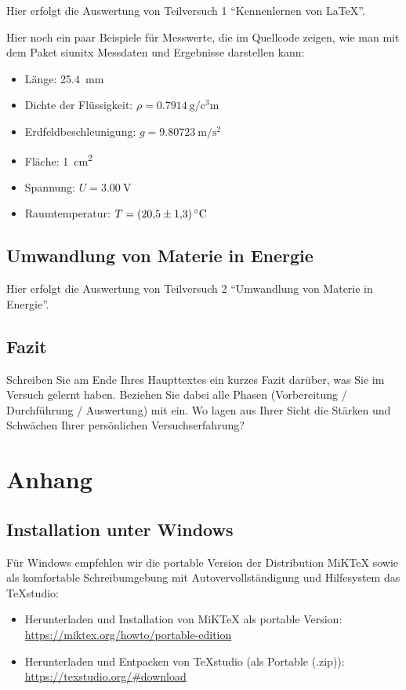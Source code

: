 \documentclass[a4paper,10pt]{report}
\begin{document}
	Hier erfolgt die Auswertung von Teilversuch 1 \enquote{Kennenlernen von \LaTeX}.
	
	Hier noch ein paar Beispiele für Messwerte, die im Quellcode zeigen, wie man mit dem Paket siunitx Messdaten und Ergebnisse darstellen kann:
	\begin{itemize}
		\item Länge: \SI{25.4}{\milli\meter}
		\item Dichte der Flüssigkeit: $\rho = \SI{0.7914}{\gram\per\cubic\centi\metre}$
		\item Erdfeldbeschleunigung: $g = \SI{9.80723}{\metre\per\square\second}$
		\item Fläche: \SI{1}{\centi\metre\squared}
		\item Spannung: $U = \SI{3.00}{\volt}$
		\item Raumtemperatur: $T = \SI{20.5+-1.3}{\celsius}$ 
	\end{itemize} 
	
	
	\section{Umwandlung von Materie in Energie}
	
	Hier erfolgt die Auswertung von Teilversuch 2 \enquote{Umwandlung von Materie in
		Energie}.
	
	\section{Fazit}
	Schreiben Sie am Ende Ihres Haupttextes ein kurzes Fazit darüber, was Sie im
	Versuch gelernt haben. Beziehen Sie dabei alle Phasen (Vorbereitung /
	Durchführung / Auswertung) mit ein. Wo lagen aus Ihrer Sicht die Stärken und
	Schwächen Ihrer persönlichen Versuchserfahrung?
	
	\appendix
	\chapter{Anhang}
	
	\section{Installation unter Windows}
	\label{sec:LaTeX-Installation-auf-Windows}
	
	Für Windows empfehlen wir die portable Version der Distribution MiKTeX sowie als
	komfortable Schreibumgebung mit Autovervollständigung und Hilfesystem das
	TeXstudio:
	\begin{itemize}
		\item Herunterladen und Installation von MiKTeX als portable Version:
		\\\url{https://miktex.org/howto/portable-edition}
		\item Herunterladen und Entpacken von TeXstudio (als Portable (.zip)):
		\\\url{https://texstudio.org/#download}
	\end{itemize}
	
\end{document}
